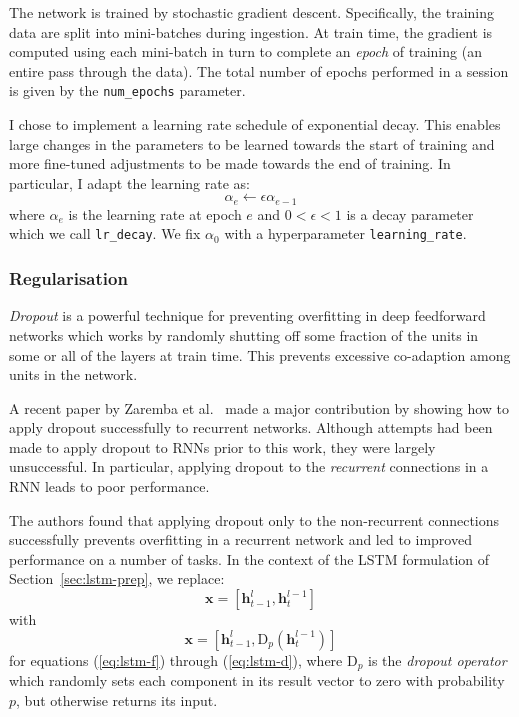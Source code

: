 \documentclass[12pt,a4paper,twoside,openright]{report}
\newcommand{\vect}[1]{\boldsymbol{\mathbf{#1}}}
\begin{document}
The network is trained by stochastic gradient descent. Specifically, the
training data are split into mini-batches during ingestion. At train time, the
gradient is computed using each mini-batch in turn to complete an \emph{epoch}
of training (an entire pass through the data). The total number of epochs
performed in a session is given by the \texttt{num\_epochs} parameter.

I chose to implement a learning rate schedule of exponential decay. This enables
large changes in the parameters to be learned towards the start of training and
more fine-tuned adjustments to be made towards the end of training. In
particular, I adapt the learning rate as:
$$ \alpha_e \gets \epsilon\alpha_{e-1} $$
where $\alpha_e$ is the learning rate at epoch $e$ and $0 < \epsilon < 1$ is a
decay parameter which we call \texttt{lr\_decay}. We fix $\alpha_0$ with a
hyperparameter \texttt{learning\_rate}.

\subsubsection{Regularisation}

\emph{Dropout} \cite{srivastava2014dropout} is a powerful technique for
preventing overfitting in deep feedforward networks which works by randomly
shutting off some fraction of the units in some or all of the layers at train
time. This prevents excessive co-adaption among units in the network.

A recent paper by Zaremba et al.\ \cite{zaremba2014recurrent} made a major
contribution by showing how to apply dropout successfully to recurrent networks.
Although attempts had been made to apply dropout to RNNs prior to this work,
they were largely unsuccessful. In particular, applying dropout to the
\emph{recurrent} connections in a RNN leads to poor performance.

The authors found that applying dropout only to the non-recurrent connections
successfully prevents overfitting in a recurrent network and led to improved
performance on a number of tasks. In the context of the LSTM formulation of
Section~\ref{sec:lstm-prep}, we replace:
$$ \vect{x} = [\vect{h}_{t-1}^l, \vect{h}_t^{l-1}] $$
with
$$ \vect{x} = [\vect{h}_{t-1}^l, \mathrm{D}_p(\vect{h}_t^{l-1})] $$
for equations (\ref{eq:lstm-f}) through (\ref{eq:lstm-d}), where $\mathrm{D}_p$
is the \emph{dropout operator} which randomly sets each component in its result
vector to zero with probability $p$, but otherwise returns its input. 
\end{document}

